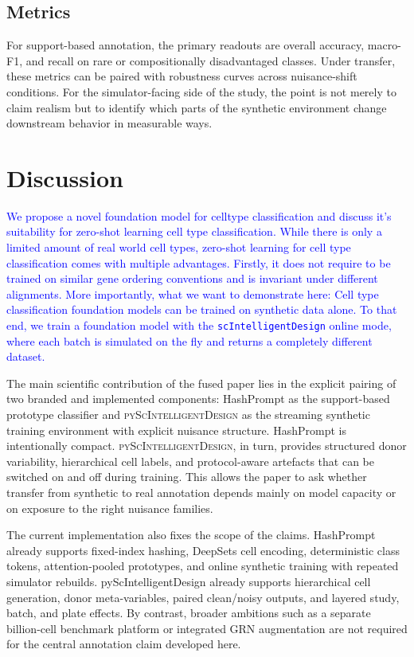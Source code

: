 \documentclass{article}
\newcommand{\phflo}[1]{\textcolor{blue}{#1}}
\begin{document}
\subsection{Metrics}
For support-based annotation, the primary readouts are overall accuracy, macro-F1, and recall on rare or compositionally disadvantaged classes. Under transfer, these metrics can be paired with robustness curves across nuisance-shift conditions. For the simulator-facing side of the study, the point is not merely to claim realism but to identify which parts of the synthetic environment change downstream behavior in measurable ways.

\section{Discussion}

\phflo{We propose a novel foundation model for celltype classification and discuss it's suitability for zero-shot learning cell type classification. While there is only a limited amount of real world cell types, zero-shot learning for cell type classification comes with multiple advantages. Firstly, it does not require to be trained on similar gene ordering conventions and is invariant under different alignments. More importantly, what we want to demonstrate here: Cell type classification foundation models can be trained on synthetic data alone. To that end, we train a foundation model with the \texttt{scIntelligentDesign} online mode, where each batch is simulated on the fly and returns a completely different dataset.}

The main scientific contribution of the fused paper lies in the explicit pairing of two branded and implemented components: HashPrompt as the support-based prototype classifier and \textsc{pyScIntelligentDesign} as the streaming synthetic training environment with explicit nuisance structure. HashPrompt is intentionally compact. \textsc{pyScIntelligentDesign}, in turn, provides structured donor variability, hierarchical cell labels, and protocol-aware artefacts that can be switched on and off during training. This allows the paper to ask whether transfer from synthetic to real annotation depends mainly on model capacity or on exposure to the right nuisance families.

The current implementation also fixes the scope of the claims. HashPrompt already supports fixed-index hashing, DeepSets cell encoding, deterministic class tokens, attention-pooled prototypes, and online synthetic training with repeated simulator rebuilds. pyScIntelligentDesign already supports hierarchical cell generation, donor meta-variables, paired clean/noisy outputs, and layered study, batch, and plate effects. By contrast, broader ambitions such as a separate billion-cell benchmark platform or integrated GRN augmentation are not required for the central annotation claim developed here.
\end{document}
